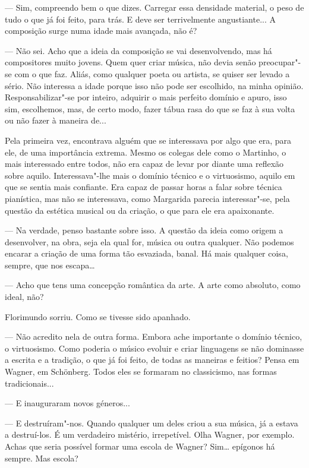 --- Sim, compreendo bem o que dizes. Carregar essa densidade material, o
peso de tudo o que já foi feito, para trás. E deve ser terrivelmente
angustiante... A composição surge numa idade mais avançada, não é?

--- Não sei. Acho que a ideia da composição se vai desenvolvendo, mas há
compositores muito jovens. Quem quer criar música, não devia senão
preocupar"-se com o que faz. Aliás, como qualquer poeta ou artista, se
quiser ser levado a sério. Não interessa a idade porque isso não pode
ser escolhido, na minha opinião. Responsabilizar"-se por inteiro,
adquirir o mais perfeito domínio e apuro, isso sim, escolhemos, mas, de
certo modo, fazer tábua rasa do que se faz à sua volta ou não fazer à
maneira de...

Pela primeira vez, encontrava alguém que se interessava por algo que
era, para ele, de uma importância extrema. Mesmo os colegas dele como o
Martinho, o mais interessado entre todos, não era capaz de levar por
diante uma reflexão sobre aquilo. Interessava"-lhe mais o domínio técnico
e o virtuosismo, aquilo em que se sentia mais confiante. Era capaz de
passar horas a falar sobre técnica pianística, mas não se interessava,
como Margarida parecia interessar"-se, pela questão da estética musical
ou da criação, o que para ele era apaixonante.

--- Na verdade, penso bastante sobre isso. A questão da ideia como origem
a desenvolver, na obra, seja ela qual for, música ou outra qualquer. Não
podemos encarar a criação de uma forma tão esvaziada, banal. Há mais
qualquer coisa, sempre, que nos escapa\ldots{}

--- Acho que tens uma concepção romântica da arte. A arte como absoluto,
como ideal, não?

Florimundo sorriu. Como se tivesse sido apanhado.

--- Não acredito nela de outra forma. Embora ache importante o domínio
técnico, o virtuosismo. Como poderia o músico evoluir e criar linguagens
se não dominasse a escrita e a tradição, o que já foi feito, de todas as
maneiras e feitios? Pensa em Wagner, em Schönberg. Todos eles se
formaram no classicismo, nas formas tradicionais...

--- E inauguraram novos géneros...

--- E destruíram"-nos. Quando qualquer um deles criou a sua música, já a
estava a destruí-los. É um verdadeiro mistério, irrepetível. Olha
Wagner, por exemplo. Achas que seria possível formar uma escola de
Wagner? Sim\ldots{} epígonos há sempre. Mas escola?

